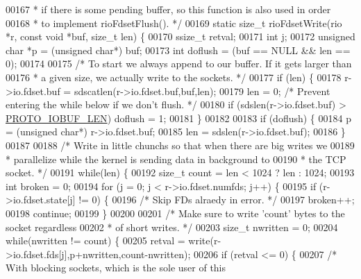 \begin{DoxyCode}
00167 \textcolor{comment}{ * if there is some pending buffer, so this function is also used in order}
00168 \textcolor{comment}{ * to implement rioFdsetFlush(). */}
00169 \textcolor{keyword}{static} size\_t rioFdsetWrite(rio *r, \textcolor{keyword}{const} \textcolor{keywordtype}{void} *buf, size\_t len) \{
00170     ssize\_t retval;
00171     \textcolor{keywordtype}{int} j;
00172     \textcolor{keywordtype}{unsigned} \textcolor{keywordtype}{char} *p = (\textcolor{keywordtype}{unsigned} \textcolor{keywordtype}{char}*) buf;
00173     \textcolor{keywordtype}{int} doflush = (buf == NULL && len == 0);
00174 
00175     \textcolor{comment}{/* To start we always append to our buffer. If it gets larger than}
00176 \textcolor{comment}{     * a given size, we actually write to the sockets. */}
00177     \textcolor{keywordflow}{if} (len) \{
00178         r->io.fdset.buf = sdscatlen(r->io.fdset.buf,buf,len);
00179         len = 0; \textcolor{comment}{/* Prevent entering the while below if we don't flush. */}
00180         \textcolor{keywordflow}{if} (sdslen(r->io.fdset.buf) > \hyperlink{server_8h_ac30919814359f46fb41e9fc497dd8e05}{PROTO\_IOBUF\_LEN}) doflush = 1;
00181     \}
00182 
00183     \textcolor{keywordflow}{if} (doflush) \{
00184         p = (\textcolor{keywordtype}{unsigned} \textcolor{keywordtype}{char}*) r->io.fdset.buf;
00185         len = sdslen(r->io.fdset.buf);
00186     \}
00187 
00188     \textcolor{comment}{/* Write in little chunchs so that when there are big writes we}
00189 \textcolor{comment}{     * parallelize while the kernel is sending data in background to}
00190 \textcolor{comment}{     * the TCP socket. */}
00191     \textcolor{keywordflow}{while}(len) \{
00192         size\_t count = len < 1024 ? len : 1024;
00193         \textcolor{keywordtype}{int} broken = 0;
00194         \textcolor{keywordflow}{for} (j = 0; j < r->io.fdset.numfds; j++) \{
00195             \textcolor{keywordflow}{if} (r->io.fdset.state[j] != 0) \{
00196                 \textcolor{comment}{/* Skip FDs alraedy in error. */}
00197                 broken++;
00198                 \textcolor{keywordflow}{continue};
00199             \}
00200 
00201             \textcolor{comment}{/* Make sure to write 'count' bytes to the socket regardless}
00202 \textcolor{comment}{             * of short writes. */}
00203             size\_t nwritten = 0;
00204             \textcolor{keywordflow}{while}(nwritten != count) \{
00205                 retval = write(r->io.fdset.fds[j],p+nwritten,count-nwritten);
00206                 \textcolor{keywordflow}{if} (retval <= 0) \{
00207                     \textcolor{comment}{/* With blocking sockets, which is the sole user of this}

\end{DoxyCode}

